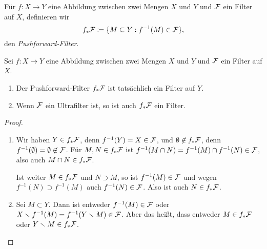 \begin{definition}
Für $f\colon X\to Y$ eine Abbildung zwischen zwei Mengen $X$ und $Y$ und $\cal F$ ein Filter auf $X$, definieren wir
\[
f_*\cal F \coloneqq \{M\subset Y : f^{-1}(M)\in\cal F\},
\]
den \emph{Pushforward-Filter}.
\end{definition}

\begin{lemma}
Sei $f\colon X\to Y$ eine Abbildung zwischen zwei Mengen $X$ und $Y$ und $\cal F$ ein Filter auf $X$.
\begin{enumerate}
\item Der Pushforward-Filter $f_*\cal F$ ist tatsächlich ein Filter auf $Y$.
\item Wenn $\cal F$ ein Ultrafilter ist, so ist auch $f_*\cal F$ ein Filter.
\end{enumerate}
\end{lemma}
\begin{proof}\leavevmode
\begin{enumerate}
\item Wir haben $Y\in f_*\cal F$, denn $f^{-1}(Y) = X\in\cal F$, und $\emptyset\not\in f_*\cal F$, denn $f^{-1}(\emptyset) = \emptyset\not\in\cal F$. Für $M,N\in f_*\cal F$ ist $f^{-1}(M\cap N) = f^{-1}(M)\cap f^{-1}(N)\in\cal F$, also auch $M\cap N\in f_*\cal F$.

Ist weiter $M\in f_*\cal F$ und $N\supset M$, so ist $f^{-1}(M)\in\cal F$ und wegen $f^{-1}(N)\supset f^{-1}(M)$ auch $f^{-1}(N)\in \cal F$. Also ist auch $N\in f_*\cal F$.
\item Sei $M\subset Y$. Dann ist entweder $f^{-1}(M)\in\cal F$ oder $X\setminus f^{-1}(M) = f^{-1}(Y\setminus M)\in\cal F$. Aber das heißt, dass entweder $M\in f_*\cal F$ oder $Y\setminus M\in f_*\cal F$.\qedhere
\end{enumerate}
\end{proof}

